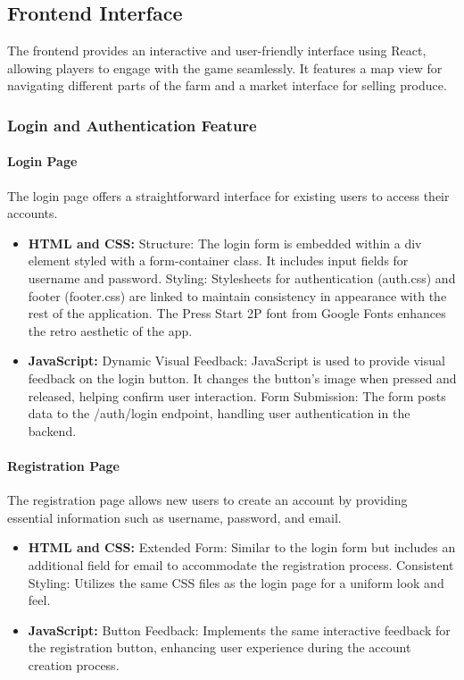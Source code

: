 \documentclass[12pt]{article}
\begin{document}
\subsection{Frontend Interface}
The frontend provides an interactive and user-friendly interface using React, allowing players to engage with the game seamlessly. It features a map view for navigating different parts of the farm and a market interface for selling produce.
\subsubsection{Login and Authentication Feature}
\paragraph{Login Page}
The login page offers a straightforward interface for existing users to access their accounts.
\begin{itemize}
    \item \textbf{HTML and CSS:} Structure: The login form is embedded within a div element styled with a form-container class. It includes input fields for username and password. Styling: Stylesheets for authentication (auth.css) and footer (footer.css) are linked to maintain consistency in appearance with the rest of the application. The Press Start 2P font from Google Fonts enhances the retro aesthetic of the app.
    \item \textbf{JavaScript:} Dynamic Visual Feedback: JavaScript is used to provide visual feedback on the login button. It changes the button's image when pressed and released, helping confirm user interaction. Form Submission: The form posts data to the /auth/login endpoint, handling user authentication in the backend.
\end{itemize}
\paragraph{Registration Page}
The registration page allows new users to create an account by providing essential information such as username, password, and email.
\begin{itemize}
    \item \textbf{HTML and CSS:} Extended Form: Similar to the login form but includes an additional field for email to accommodate the registration process. Consistent Styling: Utilizes the same CSS files as the login page for a uniform look and feel.
    \item \textbf{JavaScript:} Button Feedback: Implements the same interactive feedback for the registration button, enhancing user experience during the account creation process.
\end{itemize}
\end{document}
